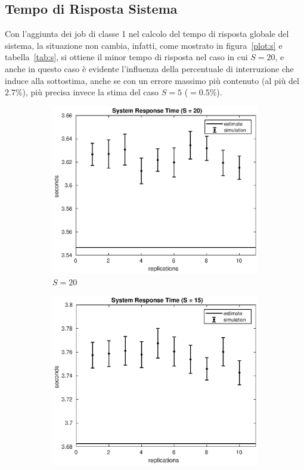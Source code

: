 \subsection{Tempo di Risposta Sistema}
Con l'aggiunta dei job di classe 1 nel calcolo del tempo di risposta globale del
sistema, la situazione non cambia, infatti, come mostrato in 
figura~\ref{plot:s} e tabella~\ref{tab:s}, si ottiene il minor tempo di risposta
nel caso in cui $S=20$, e anche in questo caso è evidente l'influenza della
percentuale di interruzione che induce alla sottostima, anche se con un errore
massimo più contenuto (al più del $2.7\%$), più precisa invece la stima
del caso $S=5$ (\epsmx$=0.5\%$).
\begin{figure}[!h]
\centering
%
\begin{subfigure}[t]{0.49\textwidth}
\includegraphics[width=\textwidth]{figures/simul/20_500K_s}
\caption{$S = 20$}
\label{20_s}
\end{subfigure}
%
\begin{subfigure}[t]{0.49\textwidth}
\includegraphics[width=\textwidth]{figures/simul/15_500K_s}

\end{subfigure}
\end{figure}
